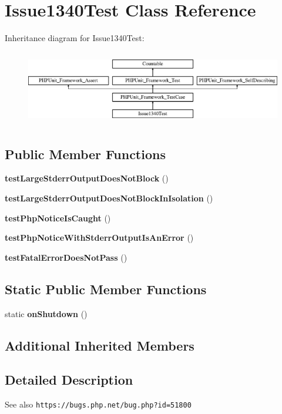 \section{Issue1340\+Test Class Reference}
\label{class_issue1340_test}
Inheritance diagram for Issue1340\+Test\+:\begin{figure}[H]
\begin{center}
\leavevmode
\includegraphics[height=3.303835cm]{class_issue1340_test}
\end{center}
\end{figure}
\subsection*{Public Member Functions}
\begin{DoxyCompactItemize}
\item 
{\bf test\+Large\+Stderr\+Output\+Does\+Not\+Block} ()
\item 
{\bf test\+Large\+Stderr\+Output\+Does\+Not\+Block\+In\+Isolation} ()
\item 
{\bf test\+Php\+Notice\+Is\+Caught} ()
\item 
{\bf test\+Php\+Notice\+With\+Stderr\+Output\+Is\+An\+Error} ()
\item 
{\bf test\+Fatal\+Error\+Does\+Not\+Pass} ()
\end{DoxyCompactItemize}
\subsection*{Static Public Member Functions}
\begin{DoxyCompactItemize}
\item 
static {\bf on\+Shutdown} ()
\end{DoxyCompactItemize}
\subsection*{Additional Inherited Members}


\subsection{Detailed Description}
\begin{DoxySeeAlso}{See also}
{\tt https\+://bugs.\+php.\+net/bug.\+php?id=51800} 
\end{DoxySeeAlso}


